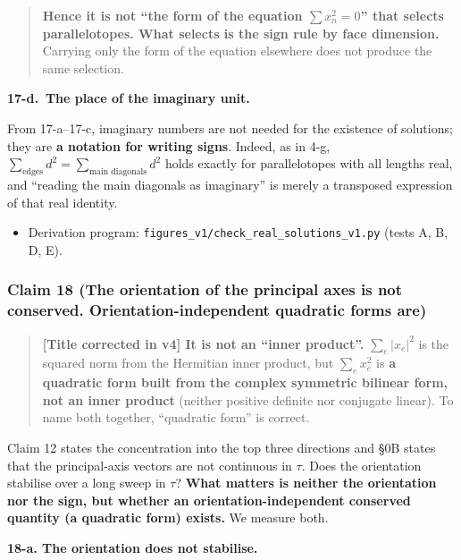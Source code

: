 \documentclass[
  10pt,
]{article}
\providecommand{\tightlist}{%
  \setlength{\itemsep}{0pt}\setlength{\parskip}{0pt}}
\begin{document}
\begin{quote}
\textbf{Hence it is not ``the form of the equation \(\sum x_n^2 = 0\)''
that selects parallelotopes. What selects is the sign rule by face
dimension.} Carrying only the form of the equation elsewhere does not
produce the same selection.
\end{quote}

\textbf{17-d.~The place of the imaginary unit.}

From 17-a--17-c, imaginary numbers are not needed for the existence of
solutions; they are \textbf{a notation for writing signs}. Indeed, as in
4-g, \(\sum_{\text{edges}}d^2 = \sum_{\text{main diagonals}}d^2\) holds
exactly for parallelotopes with all lengths real, and ``reading the main
diagonals as imaginary'' is merely a transposed expression of that real
identity.

\begin{itemize}
\tightlist
\item
  Derivation program: \texttt{figures\_v1/check\_real\_solutions\_v1.py}
  (tests A, B, D, E).
\end{itemize}

\subsubsection{Claim 18 (The orientation of the principal axes is not
conserved. Orientation-independent quadratic forms
are)}\label{claim-18-the-orientation-of-the-principal-axes-is-not-conserved.-orientation-independent-quadratic-forms-are}

\begin{quote}
\textbf{{[}Title corrected in v4{]} It is not an ``inner product''.}
\(\sum_e\lvert x_e\rvert^2\) is the squared norm from the Hermitian
inner product, but \(\sum_e x_e^2\) is \textbf{a quadratic form built
from the complex symmetric bilinear form, not an inner product} (neither
positive definite nor conjugate linear). To name both together,
``quadratic form'' is correct.
\end{quote}

Claim 12 states the concentration into the top three directions and §0B
states that the principal-axis vectors are not continuous in \(\tau\).
Does the orientation stabilise over a long sweep in \(\tau\)?
\textbf{What matters is neither the orientation nor the sign, but
whether an orientation-independent conserved quantity (a quadratic form)
exists.} We measure both.

\textbf{18-a. The orientation does not stabilise.}
\end{document}
